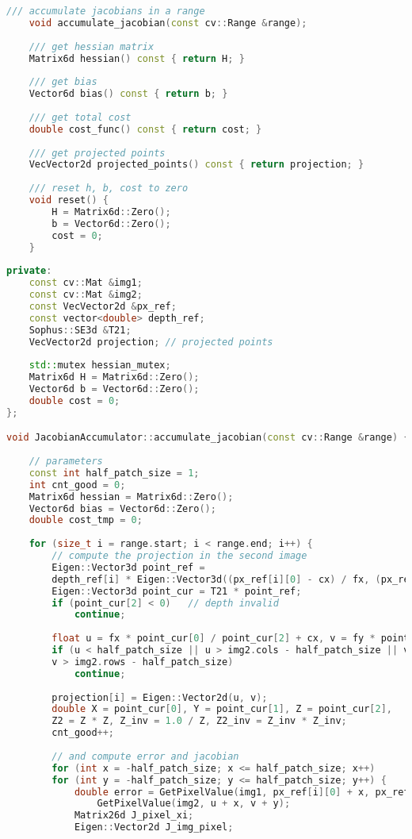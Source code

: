 {\begin{lstlisting}[language=c++,caption=slambook2/ch8/direct_method.cpp（片段）]
	/// accumulate jacobians in a range
	void accumulate_jacobian(const cv::Range &range);
	
	/// get hessian matrix
	Matrix6d hessian() const { return H; }
	
	/// get bias
	Vector6d bias() const { return b; }
	
	/// get total cost
	double cost_func() const { return cost; }
	
	/// get projected points
	VecVector2d projected_points() const { return projection; }
	
	/// reset h, b, cost to zero
	void reset() {
		H = Matrix6d::Zero();
		b = Vector6d::Zero();
		cost = 0;
	}
	
private:
	const cv::Mat &img1;
	const cv::Mat &img2;
	const VecVector2d &px_ref;
	const vector<double> depth_ref;
	Sophus::SE3d &T21;
	VecVector2d projection; // projected points
	
	std::mutex hessian_mutex;
	Matrix6d H = Matrix6d::Zero();
	Vector6d b = Vector6d::Zero();
	double cost = 0;
};

void JacobianAccumulator::accumulate_jacobian(const cv::Range &range) {
	
	// parameters
	const int half_patch_size = 1;
	int cnt_good = 0;
	Matrix6d hessian = Matrix6d::Zero();
	Vector6d bias = Vector6d::Zero();
	double cost_tmp = 0;
	
	for (size_t i = range.start; i < range.end; i++) {
		// compute the projection in the second image
		Eigen::Vector3d point_ref =
		depth_ref[i] * Eigen::Vector3d((px_ref[i][0] - cx) / fx, (px_ref[i][1] - cy) / fy, 1);
		Eigen::Vector3d point_cur = T21 * point_ref;
		if (point_cur[2] < 0)   // depth invalid
			continue;
		
		float u = fx * point_cur[0] / point_cur[2] + cx, v = fy * point_cur[1] / point_cur[2] + cy;
		if (u < half_patch_size || u > img2.cols - half_patch_size || v < half_patch_size ||
		v > img2.rows - half_patch_size)
			continue;
		
		projection[i] = Eigen::Vector2d(u, v);
		double X = point_cur[0], Y = point_cur[1], Z = point_cur[2],
		Z2 = Z * Z, Z_inv = 1.0 / Z, Z2_inv = Z_inv * Z_inv;
		cnt_good++;
		
		// and compute error and jacobian
		for (int x = -half_patch_size; x <= half_patch_size; x++)
		for (int y = -half_patch_size; y <= half_patch_size; y++) {
			double error = GetPixelValue(img1, px_ref[i][0] + x, px_ref[i][1] + y) -
				GetPixelValue(img2, u + x, v + y);
			Matrix26d J_pixel_xi;
			Eigen::Vector2d J_img_pixel;
			

\end{lstlisting}}
